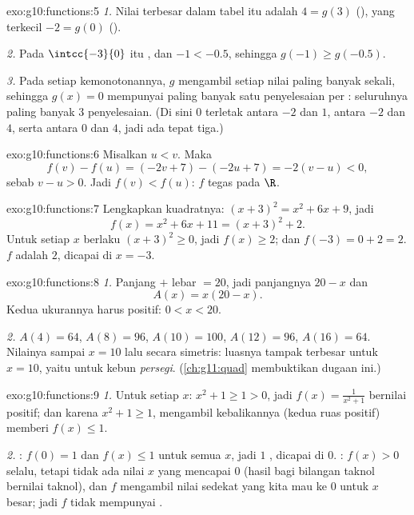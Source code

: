 \begin{solution}{exo:g10:functions:5}
\emph{1.} Nilai terbesar dalam tabel itu adalah $4 = g(3)$ (), yang
terkecil $-2 = g(0)$ ().

\emph{2.} Pada $\intcc{-3}{0}$  itu , dan
$-1 < -0.5$, sehingga $g(-1) \geq g(-0.5)$.

\emph{3.} Pada setiap  kemonotonannya, $g$ mengambil setiap nilai
paling banyak sekali, sehingga $g(x) = 0$ mempunyai paling banyak satu
penyelesaian per : seluruhnya paling banyak $3$
penyelesaian. (Di sini $0$ terletak antara $-2$ dan $1$, antara $-2$ dan
$4$, serta antara $0$ dan $4$, jadi ada tepat tiga.)
\end{solution}

\begin{solution}{exo:g10:functions:6}
Misalkan $u < v$. Maka
\[
f(v) - f(u) = (-2v + 7) - (-2u + 7) = -2(v - u) < 0,
\]
sebab $v - u > 0$. Jadi $f(v) < f(u)$: $f$ tegas  pada $\R$.
\end{solution}

\begin{solution}{exo:g10:functions:7}
Lengkapkan kuadratnya: $(x+3)^2 = x^2 + 6x + 9$, jadi
\[
f(x) = x^2 + 6x + 11 = (x + 3)^2 + 2 .
\]
Untuk setiap $x$ berlaku $(x+3)^2 \geq 0$, jadi $f(x) \geq 2$; dan
$f(-3) = 0 + 2 = 2$.  $f$ adalah $2$, dicapai di $x = -3$.
\end{solution}

\begin{solution}{exo:g10:functions:8}
\emph{1.} Panjang $+$ lebar $= 20$, jadi panjangnya $20 - x$ dan
\[
A(x) = x(20 - x).
\]
Kedua ukurannya harus positif: $0 < x < 20$.

\emph{2.} $A(4) = 64$, $A(8) = 96$, $A(10) = 100$, $A(12) = 96$,
$A(16) = 64$. Nilainya  sampai $x = 10$ lalu  secara simetris:
luasnya tampak terbesar untuk $x = 10$, yaitu untuk kebun \emph{persegi}.
(\cref{ch:g11:quad} membuktikan dugaan ini.)
\end{solution}

\begin{solution}{exo:g10:functions:9}
\emph{1.} Untuk setiap $x$: $x^2 + 1 \geq 1 > 0$, jadi $f(x) = \frac{1}{x^2+1}$
bernilai positif; dan karena $x^2 + 1 \geq 1$, mengambil kebalikannya (kedua
ruas positif) memberi $f(x) \leq 1$.

\emph{2.} : $f(0) = 1$ dan $f(x) \leq 1$ untuk semua $x$, jadi $1$
, dicapai di $0$. : $f(x) > 0$ selalu, tetapi tidak ada
nilai $x$ yang mencapai $0$ (hasil bagi bilangan taknol bernilai taknol), dan
$f$ mengambil nilai sedekat yang kita mau ke $0$ untuk $x$ besar; jadi $f$
tidak mempunyai .
\end{solution}

